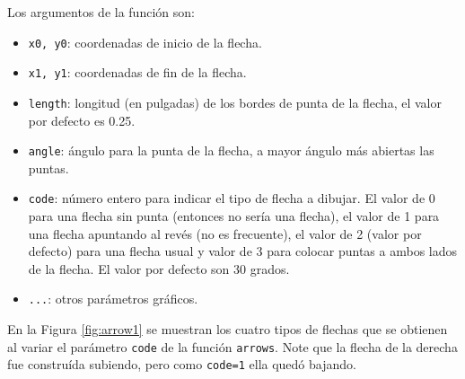 \documentclass[10pt,]{krantz}
\providecommand{\tightlist}{%
  \setlength{\itemsep}{0pt}\setlength{\parskip}{0pt}}
\begin{document}
Los argumentos de la función son:

\begin{itemize}
\tightlist
\item
  \texttt{x0,\ y0}: coordenadas de inicio de la flecha.
\item
  \texttt{x1,\ y1}: coordenadas de fin de la flecha.
\item
  \texttt{length}: longitud (en pulgadas) de los bordes de punta de la
  flecha, el valor por defecto es 0.25.
\item
  \texttt{angle}: ángulo para la punta de la flecha, a mayor ángulo más
  abiertas las puntas.
\item
  \texttt{code}: número entero para indicar el tipo de flecha a dibujar.
  El valor de 0 para una flecha sin punta (entonces no sería una
  flecha), el valor de 1 para una flecha apuntando al revés (no es
  frecuente), el valor de 2 (valor por defecto) para una flecha usual y
  valor de 3 para colocar puntas a ambos lados de la flecha. El valor
  por defecto son 30 grados.
\item
  \texttt{...}: otros parámetros gráficos.
\end{itemize}

En la Figura \ref{fig:arrow1} se muestran los cuatro tipos de flechas
que se obtienen al variar el parámetro \texttt{code} de la función
\texttt{arrows}. Note que la flecha de la derecha fue construída
subiendo, pero como \texttt{code=1} ella quedó bajando.
\end{document}
